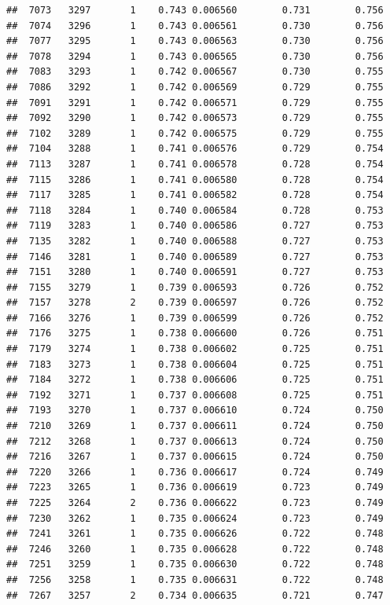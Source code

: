 \documentclass[
]{book}
\begin{document}
\begin{verbatim}
##  7073   3297       1    0.743 0.006560        0.731        0.756
##  7074   3296       1    0.743 0.006561        0.730        0.756
##  7077   3295       1    0.743 0.006563        0.730        0.756
##  7078   3294       1    0.743 0.006565        0.730        0.756
##  7083   3293       1    0.742 0.006567        0.730        0.755
##  7086   3292       1    0.742 0.006569        0.729        0.755
##  7091   3291       1    0.742 0.006571        0.729        0.755
##  7092   3290       1    0.742 0.006573        0.729        0.755
##  7102   3289       1    0.742 0.006575        0.729        0.755
##  7104   3288       1    0.741 0.006576        0.729        0.754
##  7113   3287       1    0.741 0.006578        0.728        0.754
##  7115   3286       1    0.741 0.006580        0.728        0.754
##  7117   3285       1    0.741 0.006582        0.728        0.754
##  7118   3284       1    0.740 0.006584        0.728        0.753
##  7119   3283       1    0.740 0.006586        0.727        0.753
##  7135   3282       1    0.740 0.006588        0.727        0.753
##  7146   3281       1    0.740 0.006589        0.727        0.753
##  7151   3280       1    0.740 0.006591        0.727        0.753
##  7155   3279       1    0.739 0.006593        0.726        0.752
##  7157   3278       2    0.739 0.006597        0.726        0.752
##  7166   3276       1    0.739 0.006599        0.726        0.752
##  7176   3275       1    0.738 0.006600        0.726        0.751
##  7179   3274       1    0.738 0.006602        0.725        0.751
##  7183   3273       1    0.738 0.006604        0.725        0.751
##  7184   3272       1    0.738 0.006606        0.725        0.751
##  7192   3271       1    0.737 0.006608        0.725        0.751
##  7193   3270       1    0.737 0.006610        0.724        0.750
##  7210   3269       1    0.737 0.006611        0.724        0.750
##  7212   3268       1    0.737 0.006613        0.724        0.750
##  7216   3267       1    0.737 0.006615        0.724        0.750
##  7220   3266       1    0.736 0.006617        0.724        0.749
##  7223   3265       1    0.736 0.006619        0.723        0.749
##  7225   3264       2    0.736 0.006622        0.723        0.749
##  7230   3262       1    0.735 0.006624        0.723        0.749
##  7241   3261       1    0.735 0.006626        0.722        0.748
##  7246   3260       1    0.735 0.006628        0.722        0.748
##  7251   3259       1    0.735 0.006630        0.722        0.748
##  7256   3258       1    0.735 0.006631        0.722        0.748
##  7267   3257       2    0.734 0.006635        0.721        0.747

\end{verbatim}
\end{document}
